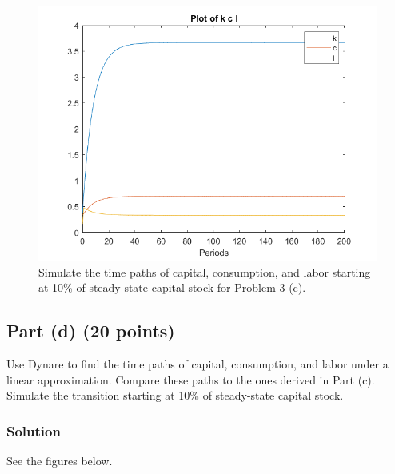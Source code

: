 \documentclass[12pt]{article}
\begin{document}
\begin{figure}[H]
    \centering
        \includegraphics[width=\textwidth]{pset3_3c.png}
        \caption{Simulate the time paths of capital, consumption, and labor starting at 10\% of steady-state capital stock for Problem 3 (c).}
        \label{fig:3c}
\end{figure}
    
\subsection*{Part (d) (20 points)}
Use Dynare to find the time paths of capital, consumption, and labor under a linear approximation. Compare these paths to the ones derived in Part (c). Simulate the transition starting at 10\% of steady-state capital stock.

\subsubsection*{Solution}
See the figures below. 
\end{document}

